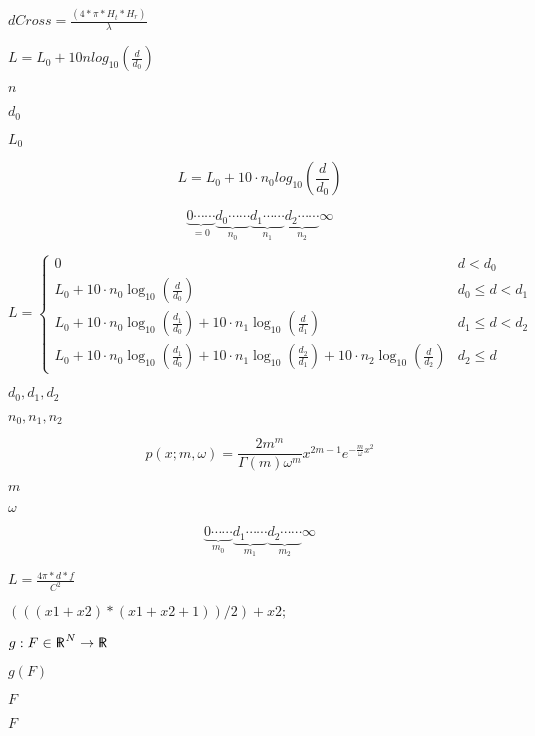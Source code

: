 \documentclass{article}
\begin{document}
$ dCross = \frac{(4 * \pi * H_t * H_r)}{\lambda} $
\pagebreak

$ L = L_0 + 10 n log_{10}(\frac{d}{d_0})$
\pagebreak

$ n $
\pagebreak

$ d_0 $
\pagebreak

$ L_0 $
\pagebreak

\[ L = L_0 + 10 \cdot n_0 log_{10}(\frac{d}{d_0})\]
\pagebreak

\[ \underbrace{0 \cdots\cdots}_{=0} \underbrace{d_0 \cdots\cdots}_{n_0} \underbrace{d_1 \cdots\cdots}_{n_1} \underbrace{d_2 \cdots\cdots}_{n_2} \infty \]
\pagebreak

\[\displaystyle L = \begin{cases} 0 & d < d_0 \\ L_0 + 10 \cdot n_0 \log_{10}(\frac{d}{d_0}) & d_0 \leq d < d_1 \\ L_0 + 10 \cdot n_0 \log_{10}(\frac{d_1}{d_0}) + 10 \cdot n_1 \log_{10}(\frac{d}{d_1}) & d_1 \leq d < d_2 \\ L_0 + 10 \cdot n_0 \log_{10}(\frac{d_1}{d_0}) + 10 \cdot n_1 \log_{10}(\frac{d_2}{d_1}) + 10 \cdot n_2 \log_{10}(\frac{d}{d_2})& d_2 \leq d \end{cases}\]
\pagebreak

$ d_0, d_1, d_2 $
\pagebreak

$ n_0, n_1, n_2 $
\pagebreak

\[ p(x; m, \omega) = \frac{2 m^m}{\Gamma(m) \omega^m} x^{2m - 1} e^{-\frac{m}{\omega} x^2} \]
\pagebreak

$ m $
\pagebreak

$ \omega $
\pagebreak

\[ \underbrace{0 \cdots\cdots}_{m_0} \underbrace{d_1 \cdots\cdots}_{m_1} \underbrace{d_2 \cdots\cdots}_{m_2} \infty \]
\pagebreak

$ L = \frac{4 \pi * d * f}{C^2}$
\pagebreak

$ (((x1 + x2) * (x1 + x2 + 1))/2) + x2; $
\pagebreak

$ g: F \in {\sf R\hspace*{-0.9ex}\rule{0.15ex}{1.5ex}\hspace*{0.9ex}}^N \rightarrow {\sf R\hspace*{-0.9ex}\rule{0.15ex}{1.5ex}\hspace*{0.9ex}} $
\pagebreak

$ g(F) $
\pagebreak

$ F $
\pagebreak

$ F$
\pagebreak
\end{document}
